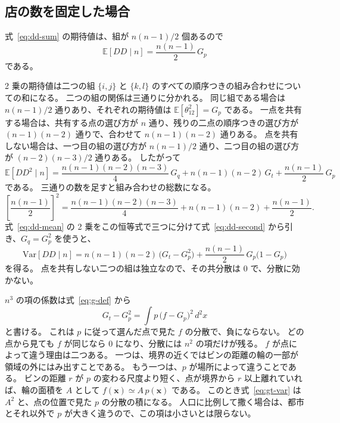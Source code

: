 \documentclass[a4paper,11pt]{ltjsarticle}
\begin{document}
\subsection{店の数を固定した場合}

式~\eqref{eq:dd-sum} の期待値は、組が $n(n-1)/2$ 個あるので
\begin{equation}
  \mathbb{E}[DD \mid n] = \frac{n(n-1)}{2}\, G_p
  \label{eq:dd-mean}
\end{equation}
である。

2 乗の期待値は二つの組 $\{i,j\}$ と $\{k,l\}$ のすべての順序つきの組み合わせについての和になる。
二つの組の関係は三通りに分かれる。
同じ組である場合は $n(n-1)/2$ 通りあり、それぞれの期待値は $\mathbb{E}[\theta_{12}^2] = G_p$ である。
一点を共有する場合は、共有する点の選び方が $n$ 通り、残りの二点の順序つきの選び方が $(n-1)(n-2)$ 通りで、合わせて $n(n-1)(n-2)$ 通りある。
点を共有しない場合は、一つ目の組の選び方が $n(n-1)/2$ 通り、二つ目の組の選び方が $(n-2)(n-3)/2$ 通りある。
したがって
\begin{equation}
  \mathbb{E}[DD^2 \mid n]
  = \frac{n(n-1)(n-2)(n-3)}{4}\, G_q + n(n-1)(n-2)\, G_t + \frac{n(n-1)}{2}\, G_p
  \label{eq:dd-second}
\end{equation}
である。
三通りの数を足すと組み合わせの総数になる。
\begin{equation}
  \left[\frac{n(n-1)}{2}\right]^2 = \frac{n(n-1)(n-2)(n-3)}{4} + n(n-1)(n-2) + \frac{n(n-1)}{2}.
  \label{eq:count-identity}
\end{equation}
式~\eqref{eq:dd-mean} の 2 乗をこの恒等式で三つに分けて式~\eqref{eq:dd-second} から引き、$G_q = G_p^2$ を使うと、
\begin{equation}
  \mathrm{Var}[DD \mid n] = n(n-1)(n-2)\, \bigl(G_t - G_p^2\bigr) + \frac{n(n-1)}{2}\, G_p\bigl(1 - G_p\bigr)
  \label{eq:var-fixed}
\end{equation}
を得る。
点を共有しない二つの組は独立なので、その共分散は $0$ で、分散に効かない。

$n^3$ の項の係数は式~\eqref{eq:g-def} から
\begin{equation}
  G_t - G_p^2 = \int p\, \bigl(f - G_p\bigr)^2\, d^2x
  \label{eq:gt-var}
\end{equation}
と書ける。
これは $p$ に従って選んだ点で見た $f$ の分散で、負にならない。
どの点から見ても $f$ が同じなら $0$ になり、分散には $n^2$ の項だけが残る。
$f$ が点によって違う理由は二つある。
一つは、境界の近くではビンの距離の輪の一部が領域の外にはみ出すことである。
もう一つは、$p$ が場所によって違うことである。
ビンの距離 $r$ が $p$ の変わる尺度より短く、点が境界から $r$ 以上離れていれば、輪の面積を $A$ として $f(\bm{x}) \simeq A\, p(\bm{x})$ である。
このとき式~\eqref{eq:gt-var} は $A^2$ と、点の位置で見た $p$ の分散の積になる。
人口に比例して撒く場合は、都市とそれ以外で $p$ が大きく違うので、この項は小さいとは限らない。
\end{document}

